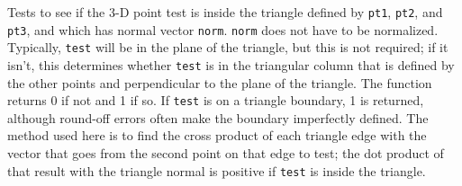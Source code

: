 \documentclass[11pt]{article}
\newcommand {\ttt} {\texttt}
\begin{document}
\begin{description}
Tests to see if the 3-D point test is inside the triangle defined by \ttt{pt1}, \ttt{pt2}, and \ttt{pt3}, and which has normal vector \ttt{norm}. \ttt{norm} does not have to be normalized. Typically, \ttt{test} will be in the plane of the triangle, but this is not required; if it isn't, this determines whether \ttt{test} is in the triangular column that is defined by the other points and perpendicular to the plane of the triangle. The function returns 0 if not and 1 if so. If \ttt{test} is on a triangle boundary, 1 is returned, although round-off errors often make the boundary imperfectly defined. The method used here is to find the cross product of each triangle edge with the vector that goes from the second point on that edge to test; the dot product of that result with the triangle normal is positive if \ttt{test} is inside the triangle.


\end{description}
\end{document}
